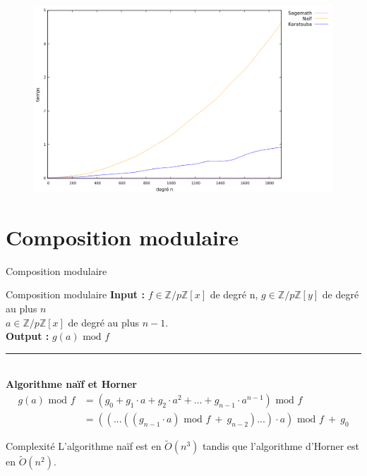 \documentclass[10pt,a4paper]{beamer}
\begin{document}
\begin{frame}
    \begin{figure}
    \includegraphics[scale=0.45, center]{multi.png}
    \end{figure}
\end{frame}

\section{Composition modulaire}
\begin{frame}{Composition modulaire}
    \begin{block}{Composition modulaire}
        \textbf{Input :} $f \in \mathbb{Z}/p\mathbb{Z}[x]$ de degré n, $g \in \mathbb{Z}/p\mathbb{Z}[y]$ de degré au plus $n$ \\ $a \in \mathbb{Z}/p\mathbb{Z}[x]$ de degré au plus $n-1$. \\
        \textbf{Output :} $g(a)\text{ mod }f$
    \end{block}
    \rule{\linewidth}{0.2mm}\\[0.5cm]
    
    \textbf{Algorithme naïf et Horner}
    \begin{align*} 
        g(a) \text{ mod }f &=(g_0+g_1\cdot a+g_2\cdot a^2+...+g_{n-1}\cdot a^{n-1}) \text{ mod } f \\
            &= ((...((g_{n-1}\cdot a)\text{ mod }f\ +\ g_{n-2})...)\cdot a)\text{ mod }f\ +\ g_0
    \end{align*}

    \begin{alertblock}{Complexité}
        L'algorithme naïf est en $\tilde{O}(n^3)$ tandis que l'algorithme d'Horner est en $\tilde{O}(n^2)$.
    \end{alertblock}
\end{frame}
\end{document}
